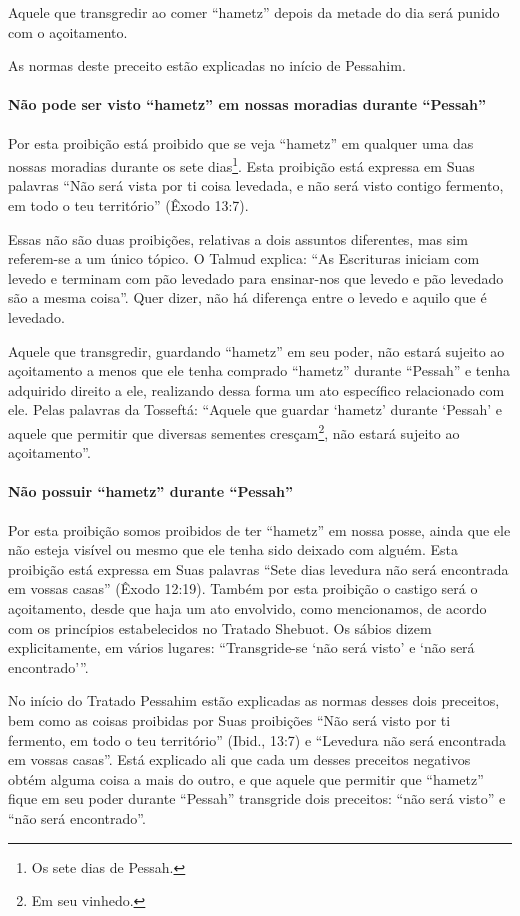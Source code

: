 Aquele que transgredir ao comer ``hametz'' depois da metade do dia será
punido com o açoitamento.

As normas deste preceito estão explicadas no início de Pessahim.

\paragraph{Não pode ser visto ``hametz'' em nossas moradias durante ``Pessah''}

Por esta proibição está proibido que se veja ``hametz'' em qualquer uma
das nossas moradias durante os sete dias\footnote{Os sete dias de Pessah.}. Esta
proibição está expressa em Suas palavras ``Não será vista por ti coisa
levedada, e não será visto contigo fermento, em todo o teu território''
(Êxodo 13:7).

Essas não são duas proibições, relativas a dois assuntos diferentes, mas
sim referem-se a um único tópico. O Talmud explica: ``As Escrituras
iniciam com levedo e terminam com pão levedado para ensinar-nos que
levedo e pão levedado são a mesma coisa''. Quer dizer, não há diferença
entre o levedo e aquilo que é levedado.

Aquele que transgredir, guardando ``hametz'' em seu poder, não estará
sujeito ao açoitamento a menos que ele tenha comprado ``hametz''
durante ``Pessah'' e tenha adquirido direito a ele, realizando dessa
forma um ato específico relacionado com ele. Pelas palavras da
Tosseftá: ``Aquele que guardar `hametz' durante `Pessah' e aquele que
permitir que diversas sementes cresçam\footnote{Em seu vinhedo.}, não estará
sujeito ao açoitamento''.

\paragraph{Não possuir ``hametz'' durante ``Pessah''}

Por esta proibição somos proibidos de ter ``hametz'' em nossa posse,
ainda que ele não esteja visível ou mesmo que ele tenha sido deixado com
alguém. Esta proibição está expressa em Suas palavras ``Sete dias
levedura não será encontrada em vossas casas'' (Êxodo 12:19). Também por
esta proibição o castigo será o açoitamento, desde que haja um ato
envolvido, como mencionamos, de acordo com os princípios estabelecidos
no Tratado Shebuot. Os sábios dizem explicitamente, em vários lugares:
``Transgride-se `não será visto' e `não será encontrado'''.

No início do Tratado Pessahim estão explicadas as normas desses dois
preceitos, bem como as coisas proibidas por Suas proibições ``Não será
visto por ti fermento, em todo o teu território'' (Ibid., 13:7) e
``Levedura não será encontrada em vossas casas''. Está explicado ali que
cada um desses preceitos negativos obtém alguma coisa a mais do outro, e
que aquele que permitir que ``hametz'' fique em seu poder durante
``Pessah'' transgride dois preceitos: ``não será visto'' e ``não será
encontrado''.

